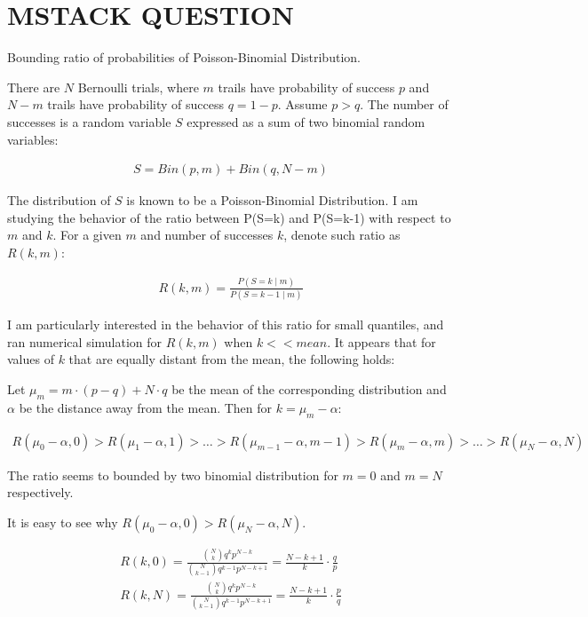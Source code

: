 \documentclass[11pt,draft]{article}
\title{}
\author{Maxim Zhilyaev \and David Zeber}
\begin{document}
\maketitle

\section{MSTACK QUESTION}
Bounding ratio of probabilities of Poisson-Binomial Distribution.

There are $N$ Bernoulli trials, where $m$  trails have probability of success $p$ and $N-m$ trails have probability of success $q=1-p$.  Assume $p>q$.
The number of successes is a random variable $S$ expressed as a sum of two binomial random variables:

\begin{align}
S = Bin(p,m) + Bin(q,N-m)
\end{align}

The distribution of $S$ is known to be a Poisson-Binomial Distribution.
I am studying the behavior of the ratio between P(S=k) and P(S=k-1) with respect to $m$ and $k$.
For a given $m$ and number of successes $k$, denote such ratio as $R(k,m)$:

\begin{align}
R(k,m)  = \frac{P(S=k \; | \;m)}{P(S=k-1 \; |\;m)}
\end{align}

I am particularly interested in the behavior of this ratio for small quantiles, and ran numerical simulation for $R(k,m)$ when $k << mean$. 
It appears that for values of $k$ that are equally distant from the mean, the following holds:

Let $\mu_m=m \cdot (p-q) + N \cdot q$ be the mean of the corresponding distribution and $\alpha$ be the distance away from the mean.
Then for $k=\mu_m - \alpha$:

\begin{align}
R(\mu_0 - \alpha,0)  > R(\mu_1 - \alpha,1) > \dots > R(\mu_{m-1} - \alpha,m-1) > R(\mu_{m} - \alpha,m) > \dots > R(\mu_{N} - \alpha,N) 
\end{align}

The ratio seems to bounded by two binomial distribution for $m=0$ and $m=N$ respectively.

It is easy to see why  $R(\mu_0 - \alpha,0) >  R(\mu_{N} - \alpha,N)$.

\begin{align}
R(k,0) = \frac{\binom{N}{k} q^kp^{N-k}}{\binom{N}{k-1} q^{k-1}p^{N-k+1}} = \frac{N-k+1}{k} \cdot \frac{q}{p} \\
R(k,N) = \frac{\binom{N}{k} q^kp^{N-k}}{\binom{N}{k-1} q^{k-1}p^{N-k+1}} = \frac{N-k+1}{k} \cdot \frac{p}{q} 
\end{align}
\end{document}
